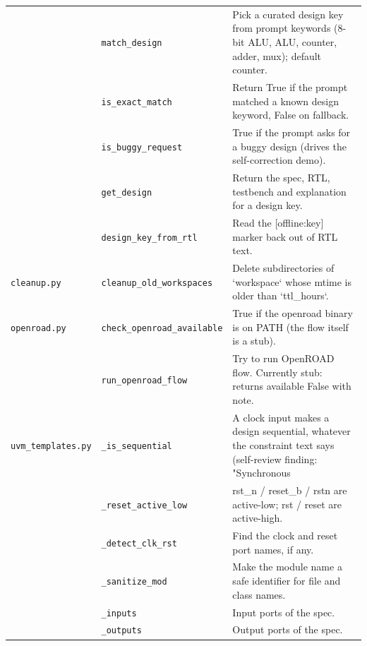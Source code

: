 \begin{longtable}{@{}p{2.8cm}>{\raggedright\arraybackslash}p{4.6cm}p{7.9cm}@{}}
{\small } & \texttt{\small match\_\allowbreak{}design} & Pick a curated design key from prompt keywords (8-bit ALU, ALU, counter, adder, mux); default counter. \\
{\small } & \texttt{\small is\_\allowbreak{}exact\_\allowbreak{}match} & Return True if the prompt matched a known design keyword, False on fallback. \\
{\small } & \texttt{\small is\_\allowbreak{}buggy\_\allowbreak{}request} & True if the prompt asks for a buggy design (drives the self-correction demo). \\
{\small } & \texttt{\small get\_\allowbreak{}design} & Return the spec, RTL, testbench and explanation for a design key. \\
{\small } & \texttt{\small design\_\allowbreak{}key\_\allowbreak{}from\_\allowbreak{}rtl} & Read the [offline:key] marker back out of RTL text. \\
{\small \nolinkurl{cleanup.py}} & \texttt{\small cleanup\_\allowbreak{}old\_\allowbreak{}workspaces} & Delete subdirectories of `workspace` whose mtime is older than `ttl\_hours`. \\
{\small \nolinkurl{openroad.py}} & \texttt{\small check\_\allowbreak{}openroad\_\allowbreak{}available} & True if the openroad binary is on PATH (the flow itself is a stub). \\
{\small } & \texttt{\small run\_\allowbreak{}openroad\_\allowbreak{}flow} & Try to run OpenROAD flow. Currently stub: returns available False with note. \\
{\small \nolinkurl{uvm_templates.py}} & \texttt{\small \_\allowbreak{}is\_\allowbreak{}sequential} & A clock input makes a design sequential, whatever the constraint text says (self-review finding: "Synchronous \\
{\small } & \texttt{\small \_\allowbreak{}reset\_\allowbreak{}active\_\allowbreak{}low} & rst\_n / reset\_b / rstn are active-low; rst / reset are active-high. \\
{\small } & \texttt{\small \_\allowbreak{}detect\_\allowbreak{}clk\_\allowbreak{}rst} & Find the clock and reset port names, if any. \\
{\small } & \texttt{\small \_\allowbreak{}sanitize\_\allowbreak{}mod} & Make the module name a safe identifier for file and class names. \\
{\small } & \texttt{\small \_\allowbreak{}inputs} & Input ports of the spec. \\
{\small } & \texttt{\small \_\allowbreak{}outputs} & Output ports of the spec. \\

\end{longtable}
